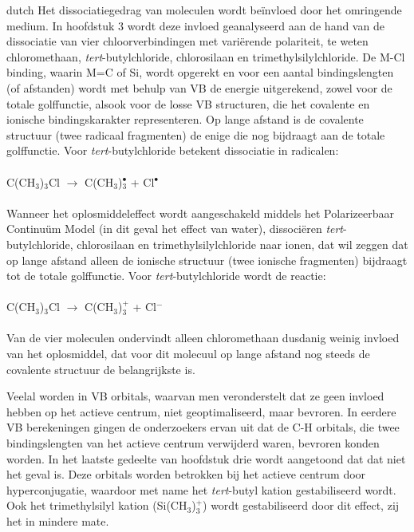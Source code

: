 \begin{otherlanguage*}{dutch}
Het dissociatiegedrag van moleculen wordt be\"{i}nvloed door het omringende medium. In hoofdstuk 3 wordt deze invloed geanalyseerd aan de hand van de dissociatie van vier chloorverbindingen met vari\"{e}rende polariteit, te weten chloromethaan, \textit{tert}-butylchloride, chlorosilaan en trimethylsilylchloride. De M-Cl binding, waarin M=C of Si, wordt opgerekt en voor een aantal bindingslengten (of afstanden) wordt met behulp van VB de energie uitgerekend, zowel voor de totale golffunctie, alsook voor de losse VB structuren, die het covalente en ionische bindingskarakter representeren. Op lange afstand is de covalente structuur (twee radicaal fragmenten) de enige die nog bijdraagt aan de totale golffunctie. Voor \textit{tert}-butylchloride betekent dissociatie in radicalen:
\\
\\
C(CH$_3$)$_3$Cl  $\rightarrow$ C(CH$_3$)$_{3}^{\bullet}$ + Cl$^\bullet$
\\
\\
\noindent{}Wanneer het oplosmiddeleffect wordt aangeschakeld middels het Polarizeerbaar Continu\"um Model (in dit geval het effect van water), dissoci\"{e}ren \textit{tert}-butylchloride, chlorosilaan en trimethylsilylchloride naar ionen, dat wil zeggen dat op lange afstand alleen de ionische structuur (twee ionische fragmenten) bijdraagt tot de totale golffunctie. Voor \textit{tert}-butylchloride wordt de reactie:
\\
\\
C(CH$_3$)$_3$Cl  $\rightarrow$ C(CH$_3$)$_{3}^{+}$ + Cl$^{-}$
\\
\\
\noindent{}Van de vier moleculen ondervindt alleen chloromethaan dusdanig weinig invloed van het oplosmiddel, dat voor dit molecuul op lange afstand nog steeds de covalente structuur de belangrijkste is. 

Veelal worden in VB orbitals, waarvan men veronderstelt dat ze geen invloed hebben op het actieve centrum, niet geoptimaliseerd, maar bevroren. In eerdere VB berekeningen gingen de onderzoekers ervan uit dat de C-H orbitals, die twee bindingslengten van het actieve centrum verwijderd waren, bevroren konden worden. In het laatste gedeelte van hoofdstuk drie wordt aangetoond dat dat niet het geval is. Deze orbitals worden betrokken bij het actieve centrum door hyperconjugatie, waardoor met name het \textit{tert}-butyl kation gestabiliseerd wordt. Ook het trimethylsilyl kation (Si(CH$_3$)$_{3}^{+}$) wordt gestabiliseerd door dit effect, zij het in mindere mate. 


\end{otherlanguage*}
